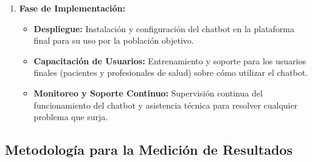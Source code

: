 \begin{enumerate}
	\item \textbf{Fase de Implementación:}
	\begin{itemize}
		\item \textbf{Despliegue:} Instalación y configuración del chatbot en la plataforma final para su uso por la población objetivo.
		\item \textbf{Capacitación de Usuarios:} Entrenamiento y soporte para los usuarios finales (pacientes y profesionales de salud) sobre cómo utilizar el chatbot.
		\item \textbf{Monitoreo y Soporte Continuo:} Supervisión continua del funcionamiento del chatbot y asistencia técnica para resolver cualquier problema que surja.
	\end{itemize}
\end{enumerate}

\subsection{Metodología para la Medición de Resultados}

